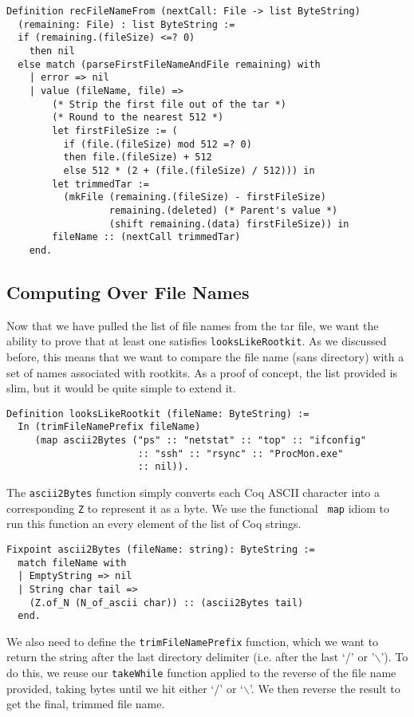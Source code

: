\documentclass[nocopyrightspace]{sigplanconf}
\begin{document}
\begin{lstlisting}
Definition recFileNameFrom (nextCall: File -> list ByteString) 
  (remaining: File) : list ByteString :=
  if (remaining.(fileSize) <=? 0)
    then nil
  else match (parseFirstFileNameAndFile remaining) with
    | error => nil
    | value (fileName, file) =>
        (* Strip the first file out of the tar *)
        (* Round to the nearest 512 *)
        let firstFileSize := (
          if (file.(fileSize) mod 512 =? 0)
          then file.(fileSize) + 512
          else 512 * (2 + (file.(fileSize) / 512))) in
        let trimmedTar := 
          (mkFile (remaining.(fileSize) - firstFileSize)
                  remaining.(deleted) (* Parent's value *)
                  (shift remaining.(data) firstFileSize)) in
        fileName :: (nextCall trimmedTar)
    end.
\end{lstlisting}

\subsection{Computing Over File Names}
Now that we have pulled the list of file names from the tar file, we want the
ability to prove that at least one satisfies {\tt looksLikeRootkit}. As we
discussed before, this means that we want to compare the file name (sans
directory) with a set of names associated with rootkits. As a proof of
concept, the list provided is slim, but it would be quite simple to extend it.

\begin{lstlisting}
Definition looksLikeRootkit (fileName: ByteString) :=
  In (trimFileNamePrefix fileName)
     (map ascii2Bytes ("ps" :: "netstat" :: "top" :: "ifconfig" 
                       :: "ssh" :: "rsync" :: "ProcMon.exe"
                       :: nil)).
\end{lstlisting}

The {\tt ascii2Bytes} function simply converts each Coq ASCII character into a
corresponding {\tt Z} to represent it as a byte. We use the functional {\tt
map} idiom to run this function an every element of the list of Coq strings.

\begin{lstlisting}
Fixpoint ascii2Bytes (fileName: string): ByteString :=
  match fileName with
  | EmptyString => nil
  | String char tail => 
    (Z.of_N (N_of_ascii char)) :: (ascii2Bytes tail)
  end.
\end{lstlisting}

We also need to define the {\tt trimFileNamePrefix} function, which we want to
return the string after the last directory delimiter (i.e. after the last `/'
or '$\backslash$'). To do this, we reuse our {\tt takeWhile} function applied
to the reverse of the file name provided, taking bytes until we hit either `/'
or `$\backslash$'. We then reverse the result to get the final, trimmed file
name.
\end{document}
